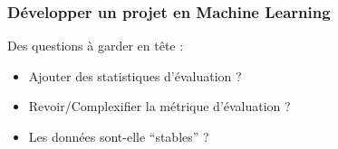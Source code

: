 \documentclass{formation}
\begin{document}
\begin{frame}
  \frametitle{Développer un projet en Machine Learning}
  Des questions à garder en tête :
  \begin{itemize}
  \item Ajouter des statistiques d'évaluation ?
  \item Revoir/Complexifier la métrique d'évaluation ?
  \item Les données sont-elle ``stables'' ?
  \end{itemize}
\end{frame}
\end{document}
